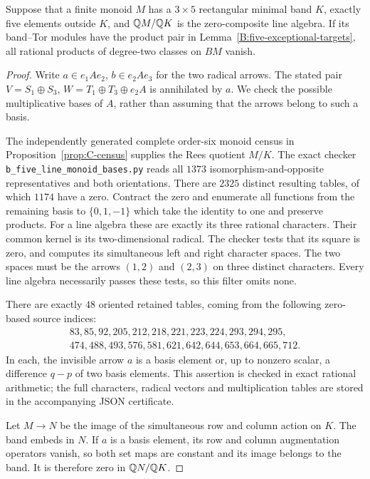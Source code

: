 \begin{lemma}
\label{B:five-line-bases}
Suppose that a finite monoid $M$ has a $3\times5$ rectangular
minimal band $K$, exactly five elements outside $K$, and
$\mathbb Q M/\mathbb Q K$ is the zero-composite line algebra.  If its band--Tor
modules have the product pair in
Lemma~\ref{B:five-exceptional-targets}, all rational products of
degree-two classes on $BM$ vanish.
\end{lemma}
\begin{proof}
Write $a\in e_1Ae_2$, $b\in e_2Ae_3$ for the two radical arrows.
The stated pair $V=S_1\oplus S_3$,
$W=T_1\oplus T_3\oplus e_2A$ is annihilated by $a$.
We check the possible multiplicative bases of $A$, rather than
assuming that the arrows belong to such a basis.

The independently generated complete order-six monoid census in
Proposition~\ref{prop:C-census} supplies the Rees quotient $M/K$.
The exact checker \texttt{b\_five\_line\_monoid\_bases.py}
reads all $1373$ isomorphism-and-opposite representatives and
both orientations.  There are $2325$ distinct resulting tables,
of which $1174$ have a zero.  Contract the zero and enumerate
all functions from the remaining basis to $\{0,1,-1\}$ which
take the identity to one and preserve products.  For a line
algebra these are exactly its three rational characters.
Their common kernel is its two-dimensional radical.  The checker
tests that its square is zero, and computes its simultaneous
left and right character spaces.  The two spaces must be the
arrows $(1,2)$ and $(2,3)$ on three distinct characters.
Every line algebra necessarily passes these tests, so this
filter omits none.

There are exactly $48$ oriented retained tables, coming from
the following zero-based source indices:
\[
\begin{gathered}
83,85,92,205,212,218,221,223,224,293,294,295,\\
474,488,493,576,581,621,642,644,653,664,665,712.
\end{gathered}
\]
In each, the invisible arrow $a$ is a basis element or, up to
nonzero scalar, a difference $q-p$ of two basis elements.
This assertion is checked in exact rational arithmetic; the full
characters, radical vectors and multiplication tables are stored
in the accompanying JSON certificate.

Let $M\to N$ be the image of the simultaneous row and column
action on $K$.  The band embeds in $N$.
If $a$ is a basis element, its row and column augmentation
operators vanish, so both set maps are constant and its image
belongs to the band.  It is therefore zero in $\mathbb Q N/\mathbb Q K$.


\end{proof}
